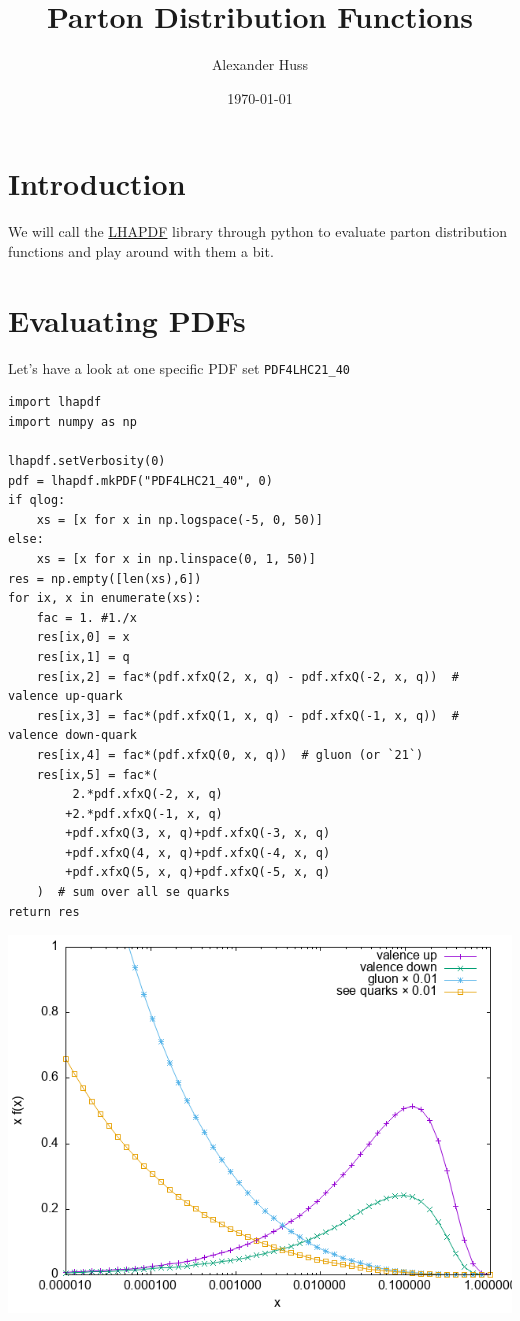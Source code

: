 \documentclass[11pt]{article}
\author{Alexander Huss}
\date{\today}
\title{Parton Distribution Functions}
\begin{document}
\maketitle
\tableofcontents



\section{Introduction}
\label{sec:orgdfdd831}
We will call the \href{https://lhapdf.hepforge.org/}{LHAPDF} library through python to evaluate parton distribution functions and play around with them a bit.

\section{Evaluating PDFs}
\label{sec:orgb667dd7}
Let's have a look at one specific PDF set \texttt{PDF4LHC21\_40}

\begin{verbatim}
import lhapdf
import numpy as np

lhapdf.setVerbosity(0)
pdf = lhapdf.mkPDF("PDF4LHC21_40", 0)
if qlog:
    xs = [x for x in np.logspace(-5, 0, 50)]
else:
    xs = [x for x in np.linspace(0, 1, 50)]
res = np.empty([len(xs),6])
for ix, x in enumerate(xs):
    fac = 1. #1./x
    res[ix,0] = x
    res[ix,1] = q
    res[ix,2] = fac*(pdf.xfxQ(2, x, q) - pdf.xfxQ(-2, x, q))  # valence up-quark
    res[ix,3] = fac*(pdf.xfxQ(1, x, q) - pdf.xfxQ(-1, x, q))  # valence down-quark
    res[ix,4] = fac*(pdf.xfxQ(0, x, q))  # gluon (or `21`)
    res[ix,5] = fac*(
         2.*pdf.xfxQ(-2, x, q)
        +2.*pdf.xfxQ(-1, x, q)
        +pdf.xfxQ(3, x, q)+pdf.xfxQ(-3, x, q)
        +pdf.xfxQ(4, x, q)+pdf.xfxQ(-4, x, q)
        +pdf.xfxQ(5, x, q)+pdf.xfxQ(-5, x, q)
    )  # sum over all se quarks
return res
\end{verbatim}

\begin{center}
\includegraphics[width=.9\linewidth]{pdf_xfx.png}
\end{center}
\end{document}
